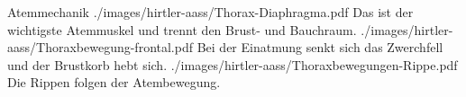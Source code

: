 \begin{Synopsis}
\end{Synopsis}

\begin{PictureSeriesWide}{}{Atemmechanik}
{./images/hirtler-aass/Thorax-Diaphragma.pdf}
{Das  ist der wichtigste Atemmuskel und
trennt den Brust- und Bauchraum. }
{./images/hirtler-aass/Thoraxbewegung-frontal.pdf} {Bei der
Einatmung senkt sich das Zwerchfell und der Brustkorb hebt
sich. }
{./images/hirtler-aass/Thoraxbewegungen-Rippe.pdf}
{Die Rippen folgen der Atembewegung.
}
{}
{}
\end{PictureSeriesWide}

